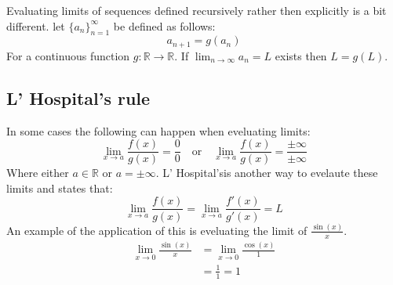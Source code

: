 \documentclass[11pt, a4paper]{article}
\newcommand*{\R}{\ensuremath{\mathbb{R}}}
\begin{document}
Evaluating limits of sequences defined recursively rather then explicitly is a bit different. let $\{ a_n \}_{n=1}^\infty$ be defined as follows:
\begin{equation*}
  a_{n+1} = g(a_n)
\end{equation*}
For a continuous function $g: \R \to \R$. If $\lim_{n\to \infty} a_n = L$ exists then $L = g(L)$.


\subsection{L' Hospital's rule}
In some cases the following can happen when eveluating limits:
\begin{equation*}
  \lim_{x\to a} \frac{f(x)}{g(x)} = \frac{0}{0} \quad \text{or} \quad \lim_{x\to a} \frac{f(x)}{g(x)} = \frac{\pm \infty}{\pm \infty}
\end{equation*}
Where either $a \in \R$ or $a = \pm \infty$. L' Hospital'sis another way to evelaute these limits and states that:
\begin{equation*}
  \lim_{x \to a}\frac{f(x)}{g(x)} = \lim_{x \to a} \frac{f'(x)}{g'(x)} = L
\end{equation*}
An example of the application of this is eveluating the limit of $\frac{\sin(x)}{x}$.
\begin{align*}
  \lim_{x\to 0} \frac{\sin(x)}{x} &= \lim_{x\to 0} \frac{\cos(x)}{1} \\
                                  &= \frac{1}{1} = 1
\end{align*}
\end{document}
